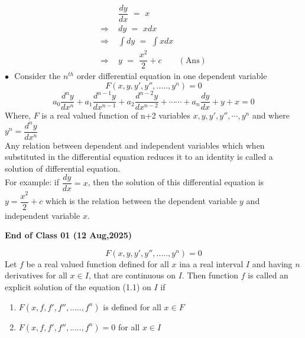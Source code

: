 \documentclass[a4aper,12pt]{report}
\begin{document}
\begin{align*}
    & \dfrac{dy}{dx}\,\, =\,\, x \\
    \Rightarrow  \,\,& dy\,\, =\,\, xdx \\
    \Rightarrow\,\, & \int dy\,\, = \,\,\int xdx \\ 
    \Rightarrow\,\,  & y \,\,= \,\,\dfrac{x^2}{2}+c \qquad (\text{Ans})
\end{align*}
$\bullet\,\,$ Consider the $n^{th}$ order differential equation in one dependent variable
$$F(x,y,y',y'',.....,y^n) = 0$$
$$a_0\dfrac{d^ny}{dx^n}+a_1\dfrac{d^{n-1}y}{dx^{n-1}}+a_2\dfrac{d^{n-2}y}{dx^{n-2}}+\cdots \cdots +a_n\dfrac{dy}{dx}+y+x= 0$$
Where, $F$ is a real valued function of n+2 variables $x,y,y',y'',\cdots,y^n$ and where $y^n=\dfrac{d^ny}{dx^n}$ \\ [5pt]
Any relation between dependent and independent variables which when substituted in the differential equation reduces it to an identity  is called a solution of differential equation. \\ [3pt]
For example: if $\dfrac{dy}{dx} = x$, then the solution of this differential equation is $y=\dfrac{x^2}{2}+c$ which is the relation between the dependent variable $y$ and independent variable $x$. 
\begin{flushright}
    {\small \textbf{End of Class 01 (12 Aug,2025)}}
\end{flushright}
\begin{equation}
    F(x,y,y',y'',.....,y^n) = 0
\end{equation}
Let $f$ be a real valued function defined for all $x$ ina a real interval $I$ and having $n$ derivatives for all $x\in I$, that are continuous on $I$. Then function $f$ is called an explicit solution of the equation (1.1) on $I$ if 
\begin{enumerate}
    \item $F(x,f,f',f'',.....,f^n)$ is defined for all $x\in F$
    \item $F(x,f,f',f'',.....,f^n) = 0$ for all $x\in I$
\end{enumerate}
\end{document}
